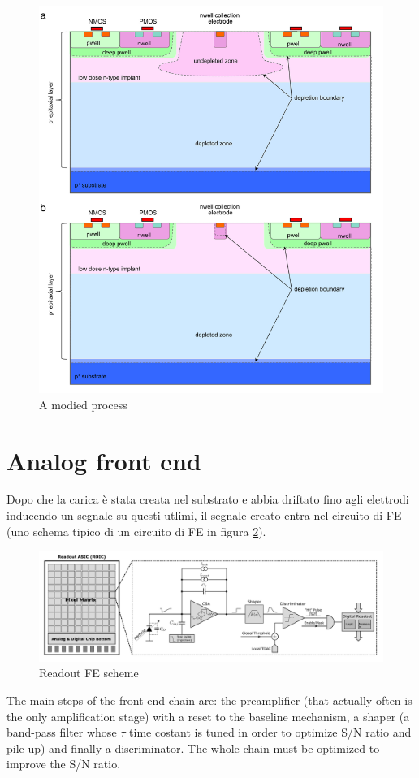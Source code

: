 \begin{figure}
   \centering
   \includegraphics[width=.7\linewidth]{figures/modified_process.png}
   \caption{A modied process}
   \label{fig:modified_process}
\end{figure}


\section{Analog front end}
Dopo che la carica è stata creata nel substrato e abbia driftato fino agli elettrodi
inducendo un segnale su questi utlimi, il segnale creato entra nel circuito di FE 
(uno schema tipico di un circuito di FE in figura \ref{fig:readout_scheme}).
\begin{figure}
   \centering
   \includegraphics[width=1.\linewidth]{figures/readout_scheme.png}
   \caption{Readout FE scheme}
   \label{fig:readout_scheme}
\end{figure}
The main steps of the front end chain are: the preamplifier (that actually often is the 
only amplification stage) with a reset to the baseline mechanism, a shaper (a band-pass 
filter whose $\tau$ time costant is tuned in order to optimize S/N ratio and pile-up)
and finally a discriminator. The whole chain must be optimized to improve the S/N ratio.\\

